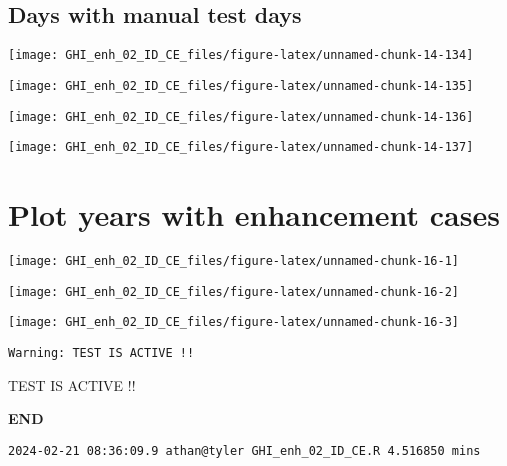 \documentclass[
  10pt,
  a4paper,oneside]{article}
\begin{document}
\FloatBarrier

\hypertarget{days-with-manual-test-days}{%
\subsection{Days with manual test days}\label{days-with-manual-test-days}}

\begin{center}\texttt{[image: GHI\_enh\_02\_ID\_CE\_files/figure-latex/unnamed-chunk-14-134]} \end{center}

\begin{center}\texttt{[image: GHI\_enh\_02\_ID\_CE\_files/figure-latex/unnamed-chunk-14-135]} \end{center}

\begin{center}\texttt{[image: GHI\_enh\_02\_ID\_CE\_files/figure-latex/unnamed-chunk-14-136]} \end{center}

\begin{center}\texttt{[image: GHI\_enh\_02\_ID\_CE\_files/figure-latex/unnamed-chunk-14-137]} \end{center}

\newpage
\FloatBarrier

\hypertarget{plot-years-with-enhancement-cases}{%
\section{Plot years with enhancement cases}\label{plot-years-with-enhancement-cases}}

\begin{center}\texttt{[image: GHI\_enh\_02\_ID\_CE\_files/figure-latex/unnamed-chunk-16-1]} \end{center}

\begin{center}\texttt{[image: GHI\_enh\_02\_ID\_CE\_files/figure-latex/unnamed-chunk-16-2]} \end{center}

\begin{center}\texttt{[image: GHI\_enh\_02\_ID\_CE\_files/figure-latex/unnamed-chunk-16-3]} \end{center}

\begin{verbatim}
Warning: TEST IS ACTIVE !!
\end{verbatim}

TEST IS ACTIVE !!

\textbf{END}

\begin{verbatim}
2024-02-21 08:36:09.9 athan@tyler GHI_enh_02_ID_CE.R 4.516850 mins
\end{verbatim}
\end{document}
